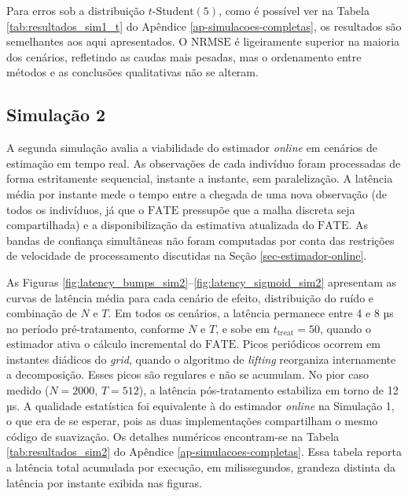 Para erros sob a distribuição \(t\text{-Student}(5)\), como é possível ver na Tabela \ref{tab:resultados_sim1_t} do Apêndice \ref{ap-simulacoes-completas}, os resultados são semelhantes aos aqui apresentados.
O \(\mathrm{NRMSE}\) é ligeiramente superior na maioria dos cenários, refletindo as caudas mais pesadas, mas o ordenamento entre métodos e as conclusões qualitativas não se alteram.

\FloatBarrier
\subsection{Simulação 2}
A segunda simulação avalia a viabilidade do estimador \emph{online} em cenários de estimação em tempo real. 
As observações de cada indivíduo foram processadas de forma estritamente sequencial, instante a instante, sem paralelização. 
A latência média por instante mede o tempo entre a chegada de uma nova observação (de todos os indivíduos, já que o \(\mathrm{FATE}\) pressupõe que a malha discreta seja compartilhada) e a disponibilização da estimativa atualizada do \(\mathrm{FATE}\). 
As bandas de confiança simultâneas não foram computadas por conta das restrições de velocidade de processamento discutidas na Seção \ref{sec-estimador-online}.

As Figuras \ref{fig:latency_bumps_sim2}--\ref{fig:latency_sigmoid_sim2} apresentam as curvas de latência média para cada cenário de efeito, distribuição do ruído e combinação de \(N\) e \(T\). 
Em todos os cenários, a latência permanece entre 4 e 8 µs no período pré-tratamento, conforme \(N\) e \(T\), e sobe em \(t_{\mathrm{treat}} = 50\), quando o estimador ativa o cálculo incremental do \(\mathrm{FATE}\).
Picos periódicos ocorrem em instantes diádicos do \emph{grid}, quando o algoritmo de \emph{lifting} reorganiza internamente a decomposição.
Esses picos são regulares e não se acumulam. No pior caso medido (\(N = 2000\), \(T = 512\)), a latência pós-tratamento estabiliza em torno de 12 µs. 
A qualidade estatística foi equivalente à do estimador \emph{online} na Simulação 1, o que era de se esperar, pois as duas implementações compartilham o mesmo código de suavização. 
Os detalhes numéricos encontram-se na Tabela \ref{tab:resultados_sim2} do Apêndice \ref{ap-simulacoes-completas}. Essa tabela reporta a latência total acumulada por execução, em milissegundos, grandeza distinta da latência por instante exibida nas figuras.

